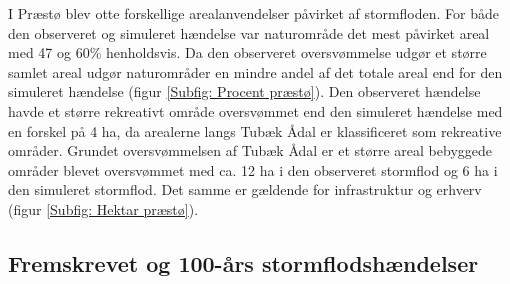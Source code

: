I Præstø blev otte forskellige arealanvendelser påvirket af stormfloden. For både den observeret og simuleret hændelse var naturområde det mest påvirket areal med 47 og 60\% henholdsvis. Da den observeret oversvømmelse udgør et større samlet areal udgør naturområder en mindre andel af det totale areal end for den simuleret hændelse (figur \ref{Subfig: Procent præstø}). Den observeret hændelse havde et større rekreativt område oversvømmet end den simuleret hændelse med en forskel på 4 ha, da arealerne langs Tubæk Ådal er klassificeret som rekreative områder. Grundet oversvømmelsen af Tubæk Ådal er et større areal bebyggede områder blevet oversvømmet med ca. 12 ha i den observeret stormflod og 6 ha i den simuleret stormflod. Det samme er gældende for infrastruktur og erhverv (figur \ref{Subfig: Hektar præstø}).


\newpage
\subsection{Fremskrevet og 100-års stormflodshændelser}

